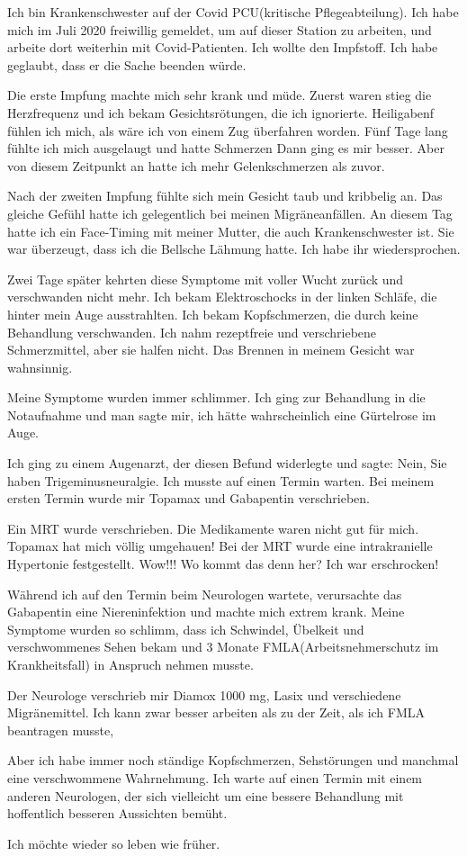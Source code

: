 

Ich bin Krankenschwester auf der Covid PCU(kritische Pflegeabteilung). Ich habe mich im Juli 2020 freiwillig gemeldet, um auf dieser Station zu arbeiten, und arbeite dort weiterhin mit Covid-Patienten. Ich wollte den Impfstoff. Ich habe geglaubt, dass er die Sache beenden würde.

Die erste Impfung machte mich sehr krank und müde. Zuerst waren stieg die Herzfrequenz und ich bekam Gesichtsrötungen, die ich ignorierte. Heiligabenf fühlen ich mich, als wäre ich von einem Zug überfahren worden. Fünf Tage lang fühlte ich mich ausgelaugt und hatte Schmerzen Dann ging es mir besser. Aber von diesem Zeitpunkt an hatte ich mehr Gelenkschmerzen als zuvor.

Nach der zweiten Impfung fühlte sich mein Gesicht taub und kribbelig an. Das gleiche Gefühl hatte ich gelegentlich bei meinen Migräneanfällen. An diesem Tag hatte ich ein Face-Timing mit meiner Mutter, die auch Krankenschwester ist. Sie war überzeugt, dass ich die Bellsche Lähmung hatte. Ich habe ihr wiedersprochen.

Zwei Tage später kehrten diese Symptome mit voller Wucht zurück und verschwanden nicht mehr. Ich bekam Elektroschocks in der linken Schläfe, die hinter mein Auge ausstrahlten. Ich bekam Kopfschmerzen, die durch keine Behandlung verschwanden. Ich nahm rezeptfreie und verschriebene Schmerzmittel, aber sie halfen nicht. Das Brennen in meinem Gesicht war wahnsinnig.

Meine Symptome wurden immer schlimmer. Ich ging zur Behandlung in die Notaufnahme und man sagte mir, ich hätte wahrscheinlich eine Gürtelrose im Auge.

Ich ging zu einem Augenarzt, der diesen Befund widerlegte und sagte: Nein, Sie haben Trigeminusneuralgie. Ich musste auf einen Termin warten. Bei meinem ersten Termin wurde mir Topamax und Gabapentin verschrieben.

Ein MRT wurde verschrieben. Die Medikamente waren nicht gut für mich. Topamax hat mich völlig umgehauen! Bei der MRT wurde eine intrakranielle Hypertonie festgestellt. Wow!!! Wo kommt das denn her? Ich war erschrocken!

Während ich auf den Termin beim Neurologen wartete, verursachte das Gabapentin eine Niereninfektion und machte mich extrem krank. Meine Symptome wurden so schlimm, dass ich Schwindel, Übelkeit und verschwommenes Sehen bekam und 3 Monate FMLA(Arbeitsnehmerschutz im Krankheitsfall) in Anspruch nehmen musste.

Der Neurologe verschrieb mir Diamox 1000 mg, Lasix und verschiedene Migränemittel. Ich kann zwar besser arbeiten als zu der Zeit, als ich FMLA beantragen musste,

Aber ich habe immer noch ständige Kopfschmerzen, Sehstörungen und manchmal eine verschwommene Wahrnehmung. Ich warte auf einen Termin mit einem anderen Neurologen, der sich vielleicht um eine bessere Behandlung mit hoffentlich besseren Aussichten bemüht.

Ich möchte wieder so leben wie früher.
